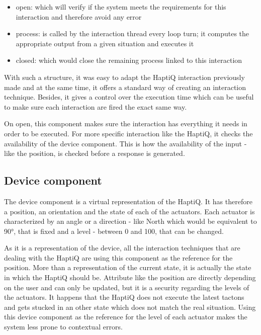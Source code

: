 \begin{itemize}
\item
  open: which will verify if the system meets the requirements for this
  interaction and therefore avoid any error
\item
  process: is called by the interaction thread every loop turn; it
  computes the appropriate output from a given situation and executes it
\item
  closed: which would close the remaining process linked to this
  interaction
\end{itemize}

With such a structure, it was easy to adapt the HaptiQ interaction
previously made and at the same time, it offers a standard way of creating
an interaction technique. Besides, it gives a control over the
execution time which can be useful to make sure each interaction are fired the exact same way.

On open, this component makes sure the interaction has everything it needs in order to be executed. For
more specific interaction like the HaptiQ, it checks the availability of
the device component. This is how the availability of the input - like the position, is checked before a response is generated.

\subsection{Device component}\label{device-component}

The device component is a virtual representation of the HaptiQ. It has
therefore a position, an orientation and the state of each of the
actuators. Each actuator is characterized by an angle or a direction -
like North which would be equivalent to 90°, that is fixed and a level -
between 0 and 100, that can be changed.

As it is a representation of the device, all the interaction techniques
that are dealing with the HaptiQ are using this component as the
reference for the position. More than a representation of the current
state, it is actually the state in which the HaptiQ should be. Attribute
like the position are directly depending on the user and can only be
updated, but it is a security regarding the levels of the actuators. It
happens that the HaptiQ does not execute the latest tactons and gets
stucked in an other state which does not match the real situation. Using
this device component as the reference for the level of each actuator
makes the system less prone to contextual errors.

